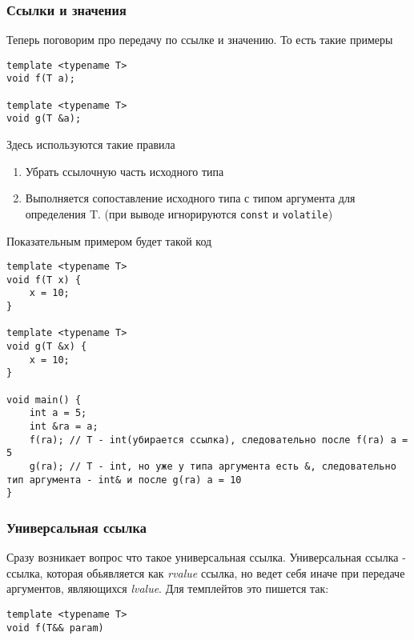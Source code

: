 		\subsubsection{Ссылки и значения}
			Теперь поговорим про передачу по ссылке и значению. То есть такие примеры
\begin{verbatim}
template <typename T>
void f(T a);

template <typename T>
void g(T &a);
\end{verbatim}
			
			Здесь используются такие правила
			\begin{enumerate}
				\item Убрать ссылочную часть исходного типа
				\item Выполняется сопоставление исходного типа с типом аргумента для определения T. (при выводе игнорируются \texttt{const} и \texttt{volatile})
			\end{enumerate}
			Показательным примером будет такой код
\begin{verbatim}
template <typename T>
void f(T x) {
	x = 10;
}

template <typename T>
void g(T &x) {
	x = 10;
}

void main() {
	int a = 5;
	int &ra = a;
	f(ra); // T - int(убирается ссылка), следовательно после f(ra) a = 5
	g(ra); // T - int, но уже у типа аргумента есть &, следовательно тип аргумента - int& и после g(ra) a = 10
}
\end{verbatim}
		
		\subsubsection{Универсальная ссылка}
			Сразу возникает вопрос что такое универсальная ссылка. Универсальная ссылка - ссылка, которая обьявляется как \textit{rvalue} ссылка, но ведет себя иначе при передаче аргументов, являющихся \textit{lvalue}.
			Для темплейтов это пишется так:
\begin{verbatim}
template <typename T>
void f(T&& param)
\end{verbatim}
			
